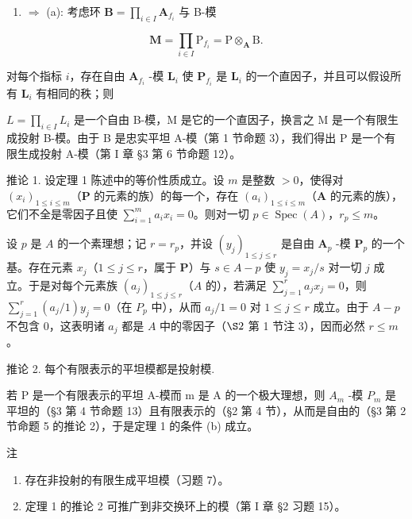 \begin{enumerate}
\def\labelenumi{(\alph{enumi})}
\setcounter{enumi}{3}
\tightlist
\item
  \(\Rightarrow\) (a): 考虑环 \(\mathbf{B} = \prod_{i\in I}\mathbf{A}_{f_i}\) 与 B-模
\end{enumerate}

\[
\mathbf {M} = \prod_ {i \in I} \mathrm{P} _ {f _ {i}} = \mathrm{P} \otimes_ {\mathbf {A}} \mathrm{B}.
\]

对每个指标 \(i\)，存在自由 \(\mathbf{A}_{f_i}\) -模 \(\mathbf{L}_i\) 使 \(\mathbf{P}_{f_i}\) 是 \(\mathbf{L}_i\) 的一个直因子，并且可以假设所有 \(\mathbf{L}_i\) 有相同的秩；则

\(L = \prod_{i \in I} L_i\) 是一个自由 B-模，M 是它的一个直因子，换言之 M 是一个有限生成投射 B-模。由于 B 是忠实平坦 A-模（第 1 节命题 3），我们得出 P 是一个有限生成投射 A-模（第 I 章 §3 第 6 节命题 12）。

推论 1. 设定理 1 陈述中的等价性质成立。设 \(m\) 是整数 \(>0\)，使得对 \((x_{i})_{1\leqslant i\leqslant m}\)（\(\mathbf{P}\) 的元素的族）的每一个，存在 \((a_{i})_{1\leqslant i\leqslant m}\)（\(\mathbf{A}\) 的元素的族），它们不全是零因子且使 \(\sum_{i=1}^{m} a_i x_i = 0\)。则对一切 \(p \in \operatorname{Spec}(A)\)，\(r_p \leqslant m\)。

设 \(p\) 是 \(A\) 的一个素理想；记 \(r = r_p\)，并设 \((y_j)_{1 \leqslant j \leqslant r}\) 是自由 \(\mathbf{A}_{p}\) -模 \(\mathbf{P}_{p}\) 的一个基。存在元素 \(x_j\)（\(1 \leqslant j \leqslant r\)，属于 \(\mathbf{P}\)）与 \(s \in A - p\) 使 \(y_j = x_j / s\) 对一切 \(j\) 成立。于是对每个元素族 \((a_j)_{1 \leqslant j \leqslant r}\)（\(A\) 的），若满足 \(\sum_{j=1}^{r} a_j x_j = 0\)，则 \(\sum_{j=1}^{r} (a_j / 1) y_j = 0\)（在 \(P_p\) 中），从而 \(a_j / 1 = 0\) 对 \(1 \leqslant j \leqslant r\) 成立。由于 \(A - p\) 不包含 0，这表明诸 \(a_j\) 都是 \(A\) 中的零因子（\(\S 2\) 第 1 节注 3），因而必然 \(r \leqslant m\)。

推论 2. 每个有限表示的平坦模都是投射模.\par

若 P 是一个有限表示的平坦 A-模而 m 是 A 的一个极大理想，则 \(A_{m}\) -模 \(P_{m}\) 是平坦的（§3 第 4 节命题 13）且有限表示的（§2 第 4 节），从而是自由的（§3 第 2 节命题 5 的推论 2），于是定理 1 的条件 (b) 成立。

注

\begin{enumerate}
\def\labelenumi{(\arabic{enumi})}
\item
  存在非投射的有限生成平坦模（习题 7）。
\item
  定理 1 的推论 2 可推广到非交换环上的模（第 I 章 §2 习题 15）。
\end{enumerate}
